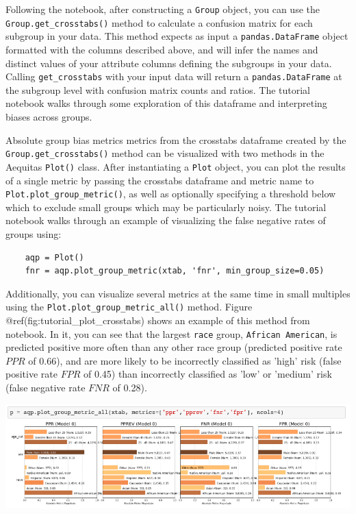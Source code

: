 \documentclass[]{krantz}
\begin{document}
Following the notebook, after constructing a \texttt{Group} object, you
can use the \texttt{Group.get\_crosstabs()} method to calculate a
confusion matrix for each subgroup in your data. This method expects as
input a \texttt{pandas.DataFrame} object formatted with the columns
described above, and will infer the names and distinct values of your
attribute columns defining the subgroups in your data. Calling
\texttt{get\_crosstabs} with your input data will return a
\texttt{pandas.DataFrame} at the subgroup level with confusion matrix
counts and ratios. The tutorial notebook walks through some exploration
of this dataframe and interpreting biases across groups.

Absolute group bias metrics metrics from the crosstabs dataframe created
by the \texttt{Group.get\_crosstabs()} method can be visualized with two
methods in the Aequitas \texttt{Plot()} class. After instantiating a
\texttt{Plot} object, you can plot the results of a single metric by
passing the crosstabs dataframe and metric name to
\texttt{Plot.plot\_group\_metric()}, as well as optionally specifying a
threshold below which to exclude small groups which may be particularly
noisy. The tutorial notebook walks through an example of visualizing the
false negative rates of groups using:

\begin{verbatim}
    aqp = Plot()
    fnr = aqp.plot_group_metric(xtab, 'fnr', min_group_size=0.05)
\end{verbatim}

Additionally, you can visualize several metrics at the same time in
small multiples using the \texttt{Plot.plot\_group\_metric\_all()}
method. Figure @ref(fig:tutorial\_plot\_crosstabs) shows an example of
this method from notebook. In it, you can see that the largest
\texttt{race} group, \texttt{African\ American}, is predicted positive
more often than any other race group (predicted positive rate \(PPR\) of
0.66), and are more likely to be incorrectly classified as 'high' risk
(false positive rate \(FPR\) of 0.45) than incorrectly classified as
'low' or 'medium' risk (false negative rate \(FNR\) of 0.28).

\begin{center}\includegraphics[width=1\linewidth]{ChapterBias/figures/tutorial_plot_crosstabs} \end{center}
\end{document}

